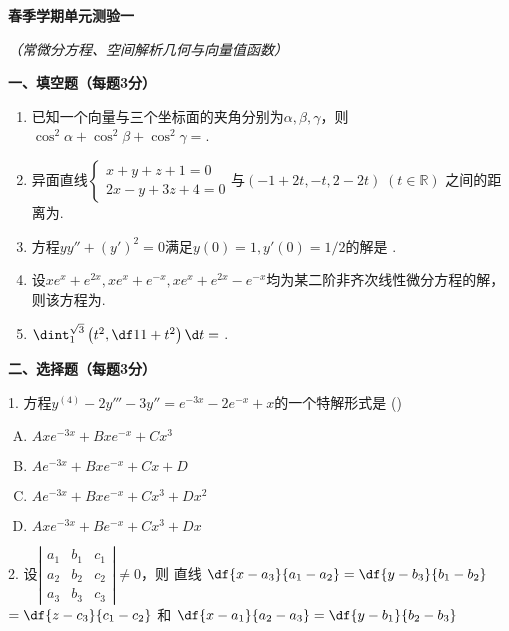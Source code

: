 \linespread{2}

\begin{center}
	{\huge
	\bf 春季学期单元测验一}
	
	\it （常微分方程、空间解析几何与向量值函数）
\end{center}


{\bf 一、填空题（每题3分）}

\begin{enumerate}
  \setlength{\itemindent}{2ex}
  \item 已知一个向量与三个坐标面的夹角分别为$\alpha,\beta,\gamma$，则
  $\cos^2\alpha+\cos^2\beta+\cos^2\gamma=$\underline{\hspace{2cm}}.
  \item 异面直线$\left\{\begin{array}{l}
  x+y+z+1=0\\2x-y+3z+4=0
  \end{array}\right.$与$(-1+2t,-t,2-2t)\;(t\in\mathbb{R})$
  之间的距离为\underline{\hspace{2cm}}.
  \item 方程$yy''+(y')^2=0$满足$y(0)=1,y'(0)=1/2$的解是
  \underline{\hspace{4cm}}.
  \item 设$xe^x+e^{2x},xe^x+e^{-x},xe^x+e^{2x}-e^{-x}$均为某二阶非齐次线性微分方程的解，
  则该方程为\underline{\hspace{4cm}}.
  \item $\dint_{1}^{\sqrt3}\left(t^2,\df1{1+t^2}\right)\d t=$
  \underline{\hspace{4cm}}.
\end{enumerate}

{\bf 二、选择题（每题3分）}

1. 方程$y^{(4)}-2y'''-3y''=e^{-3x}-2e^{-x}+x$的一个特解形式是
	(\underline{\quad})
	\begin{enumerate}[(A)]
      \setlength{\itemindent}{1cm}
	  \item $Axe^{-3x}+Bxe^{-x}+Cx^3$
	  \item $Ae^{-3x}+Bxe^{-x}+Cx+D$
	  \item $Ae^{-3x}+Bxe^{-x}+Cx^3+Dx^2$
	  \item $Axe^{-3x}+Be^{-x}+Cx^3+Dx$
	\end{enumerate}

2. 设$\left|\begin{array}{ccc}
	a_1 & b_1 & c_1\\ a_2 & b_2 & c_2\\ a_3 & b_3 & c_3
	\end{array}\right|\ne 0$，则
	直线
	$\df{x-a_3}{a_1-a_2}=\df{y-b_3}{b_1-b_2}$
	$=\df{z-c_3}{c_1-c_2}$
	和
	$\df{x-a_1}{a_2-a_3}=\df{y-b_1}{b_2-b_3}$
	
